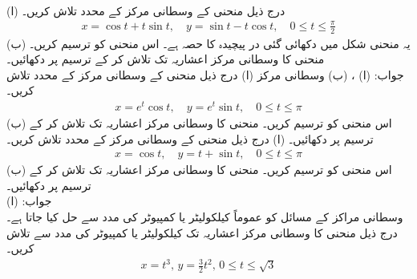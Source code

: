 \\
(ا) درج ذیل منحنی کے وسطانی مرکز کے محدد تلاش کریں۔
\begin{align*}
x=\cos t+t\sin t,\quad y=\sin t-t\cos t,\quad 0\le t\le\frac{\pi}{2}
\end{align*}
(ب) یہ منحنی شکل  میں دکھائی گئی در پیچیدہ کا حصہ ہے۔ اس منحنی کو  ترسیم کریں۔ منحنی کا وسطانی مرکز  اعشاریہ تک تلاش کر کے ترسیم  پر دکھائیں۔\\
جواب:\quad
(ا) ، (ب) وسطانی مرکز 
(ا) درج ذیل منحنی کے وسطانی مرکز کے محدد تلاش کریں۔
\begin{align*}
x=e^t\cos t,\quad y=e^t\sin t,\quad 0\le t\le\pi
\end{align*}
(ب) اس منحنی کو  ترسیم کریں۔ منحنی کا وسطانی مرکز   اعشاریہ تک تلاش کر کے ترسیم  پر دکھائیں۔
(ا) درج ذیل منحنی کے وسطانی مرکز کے محدد تلاش کریں۔
\begin{align*}
x=\cos t,\quad y=t+\sin t,\quad 0\le t\le\pi
\end{align*}
(ب) اس منحنی کو  ترسیم کریں۔ منحنی کا وسطانی مرکز   اعشاریہ تک تلاش کر کے ترسیم  پر دکھائیں۔\\
جواب:\quad
(ا) 
\\
وسطانی مراکز کے مسائل کو عموماً کیلکولیٹر یا کمپیوٹر کی مدد سے حل کیا جاتا ہے۔درج ذیل منحنی کا وسطانی مرکز  اعشاریہ تک کیلکولیٹر یا کمپیوٹر کی مدد سے تلاش کریں۔
\begin{align*}
x=t^3,\, y=\tfrac{3}{2}t^2,\, 0\le t\le \sqrt{3}
\end{align*}

